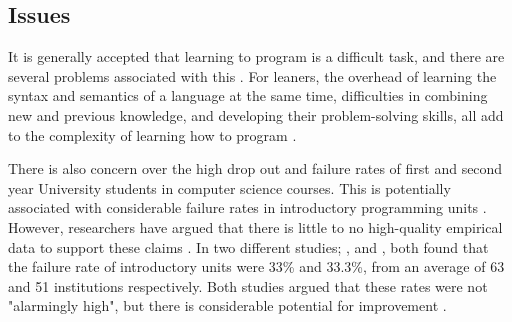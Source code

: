 \documentclass[a4paper,11.5pt]{report}
\numberwithin{figure}{section}
\numberwithin{table}{section}
\numberwithin{equation}{section}
\numberwithin{equation}{section}
\begin{document}



\subsection{Issues}


It is generally accepted that learning to program is a difficult task, and there are several problems associated with this \citep{Koulouri2014}. For leaners, the overhead of learning the syntax and semantics of a language at the same time, difficulties in combining new and previous knowledge, and developing their problem-solving skills, all add to the complexity of learning how to program \citep{Koulouri2014}.

There is also concern over the high drop out and failure rates of first and second year University students in computer science courses. This is potentially associated with considerable failure rates in introductory programming units \citep{Koulouri2014}. However, researchers have argued that there is little to no high-quality empirical data to support these claims \citep{bennedsen2007, watson2014}. In two different studies; \citet{bennedsen2007}, and \citet{watson2014}, both found that the failure rate of introductory units were 33\% and 33.3\%, from an average of 63 and 51 institutions respectively. Both studies argued that these rates were not "alarmingly high", but there is considerable potential for improvement \citep{watson2014}.
\end{document}
